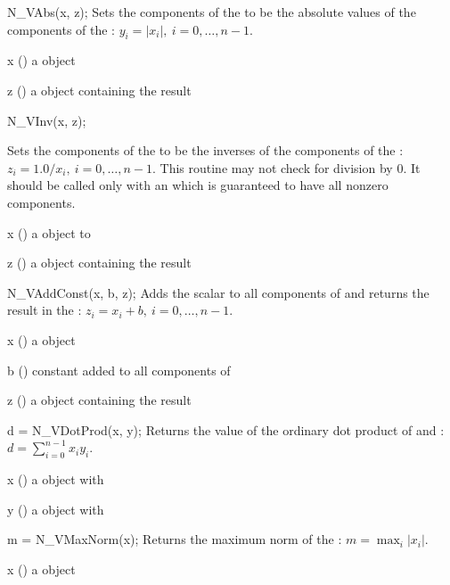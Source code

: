 {
  N\_VAbs(x, z);
}
{
  Sets the components of the   to be the absolute
  values of the components of the  :
  $y_i = | x_i | , \: i=0,\ldots,n-1$.
}
{
  \begin{args}[x]
  \item[x] () a {\nvector} object
  \item[z] () a {\nvector} object containing the result
  \end{args}
}
{}
{}

{
  N\_VInv(x, z);
}
{

  Sets the components of the   to be the inverses
  of the components of the  :
  $z_i = 1.0 /  x_i  , \: i=0,\ldots,n-1$. This routine
  may not check for division by $0$. It should be called only with an
   which is guaranteed to have all nonzero components.
}
{
  \begin{args}[x]
  \item[x] () a {\nvector} object to
  \item[z] () a {\nvector} object containing the result
  \end{args}
}
{}
{}

{
  N\_VAddConst(x, b, z);
}
{
  Adds the  scalar  to all components of 
  and returns the result in the  :
  $z_i = x_i + b , \: i=0,\ldots,n-1$.
}
{
  \begin{args}[x]
  \item[x] () a {\nvector} object
  \item[b] () constant added to all components of 
  \item[z] () a {\nvector} object containing the result
  \end{args}
}
{}
{}

{
  d = N\_VDotProd(x, y);
}
{
  Returns the value of the ordinary dot product of  and :
  $d=\sum_{i=0}^{n-1} x_i y_i$.
}
{
  \begin{args}[x]
  \item[x] () a {\nvector} object
    with 
  \item[y] () a {\nvector} object
    with 
  \end{args}
}
{
}
{}

{
  m = N\_VMaxNorm(x);
}
{
  Returns the maximum norm of the  :
  $m = \max_{i} | x_i |$.
}
{
  \begin{args}[x]
  \item[x] () a {\nvector} object
  \end{args}
}
{
}
{}


